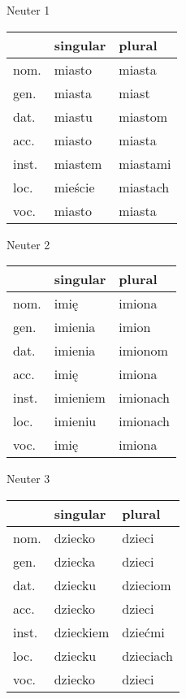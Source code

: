 \documentclass[10pt,twoside]{../filofax2}
\begin{document}
\begin{ffpage}{}
Neuter 1
\begin{tabular}{|m{1cm}||m{2.5cm}|m{2.5cm}|}
	\hline
	&singular& plural\\ \hline
	nom. &miasto&miasta\\ \hline
	gen. &miasta&miast\\ \hline
	dat. &miastu&miastom\\ \hline
	acc. &miasto&miasta\\\hline
	inst.&miastem&miastami\\ \hline
	loc. &mieście&miastach\\ \hline
	voc. &miasto&miasta\\ \hline
\end{tabular}

\vspace{0.75cm}
Neuter 2
\begin{tabular}{|m{1cm}||m{2.5cm}|m{2.5cm}|}
	\hline
	&singular& plural\\ \hline
	nom. &imię&imiona\\ \hline
	gen. &imienia&imion\\ \hline
	dat. &imienia&imionom\\ \hline
	acc. &imię&imiona\\ \hline
	inst.&imieniem&imionach\\ \hline
	loc. &imieniu&imionach\\ \hline
	voc. &imię&imiona\\\hline
\end{tabular}

\vspace{0.75cm}
Neuter 3
\begin{tabular}{|m{1cm}||m{2.5cm}|m{2.5cm}|}
	\hline
	&singular& plural\\ \hline
	nom. &dziecko&dzieci\\ \hline
	gen. &dziecka&dzieci\\ \hline
	dat. &dziecku&dzieciom\\ \hline
	acc. &dziecko&dzieci\\ \hline
	inst.&dzieckiem&dziećmi\\ \hline
	loc. &dziecku&dzieciach\\ \hline
	voc. &dziecko&dzieci\\\hline
\end{tabular}
\end{ffpage}
\end{document}
